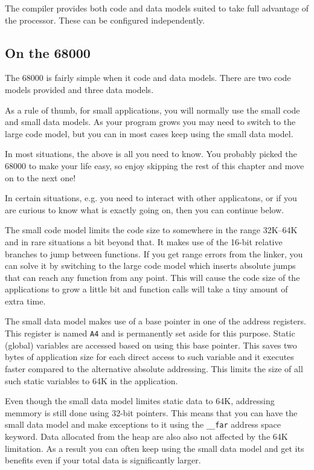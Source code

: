 The compiler provides both code and data models suited to take full
advantage of the processor. These can be configured independently.

\subsection*{On the 68000}

The 68000 is fairly simple when it code and data models. There are two
code models provided and three data models.

As a rule of thumb, for small applications, you will normally use the
small code and small data models. As your program grows you may need
to switch to the large code model, but you can in most cases keep
using the small data model.

In most situations, the above is all you need to know. You probably
picked the 68000 to make your life easy, so enjoy skipping the rest of
this chapter and move on to the next one!

In certain situations, e.g. you need to interact with other
applicatons, or if you are curious to know what is exactly going on,
then you can continue below.

The small code model limits the code size to somewhere in the range
32K--64K and in rare situations a bit beyond that. It makes use of the
16-bit relative branches to jump between functions. If you get range
errors from the linker, you can solve it by switching to the large
code model which inserts absolute jumps that can reach any function
from any point. This will cause the code size of the applications to
grow a little bit and function calls will take a tiny amount of extra
time.

The small data model makes use of a base pointer in one of the address
registers. This register is named {\tt A4} and is permanently set
aside for this purpose. Static (global) variables are accessed based
on using this base pointer. This saves two bytes of application size
for each direct access to such variable and it executes faster
compared to the alternative absolute addressing. This limits the size
of all such static variables to 64K in the application.

Even though the small data model limites static data to 64K,
addressing memmory is still done using 32-bit pointers. This means
that you can have the small data model and make exceptions to it using
the {\tt \_\_far} address space keyword. Data allocated from the heap are
also also not affected by the 64K limitation.
As a result you can often keep using the small data model and get its
benefits even if your total data is significantly larger.

